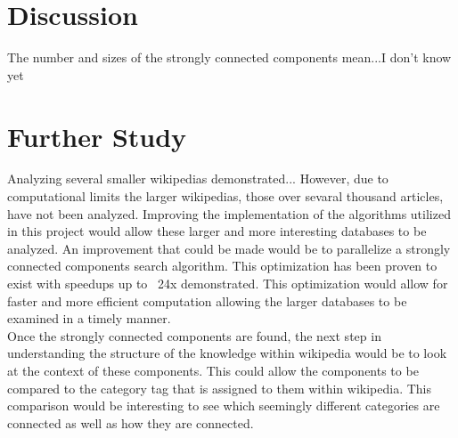 \documentclass[twoside]{article}
\begin{document}
\begin{multicols}{2} %

\section{Discussion}

The number and sizes of the strongly connected components mean...I don't know yet


\section{Further Study}

Analyzing several smaller wikipedias demonstrated...
However, due to computational limits the larger wikipedias, those over sevaral thousand articles,
have not been analyzed. Improving the implementation of the algorithms utilized in this project
would allow these larger and more interesting databases to be analyzed. An improvement
that could be made would be to parallelize a strongly connected components search algorithm. 
This optimization has been proven to exist with speedups up to ~24x demonstrated. \cite{Parallel} 
This optimization would allow for faster and more efficient computation allowing 
the larger databases to be examined in a timely manner.\\

Once the strongly connected components are found, the next step in understanding the 
structure of the knowledge within wikipedia would be to look at the context of these components.
This could allow the components to be compared to the category tag that is assigned to them
within wikipedia. This comparison would be interesting to see which seemingly different
categories are connected as well as how they are connected.\\


\end{multicols}


\newpage

\end{document}

